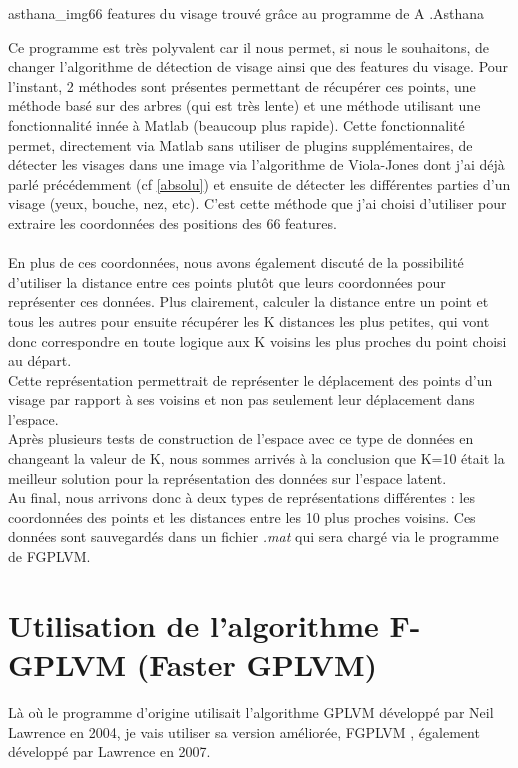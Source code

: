 \documentclass[poster]{polytech/polytech}
\begin{document}
\begin{Figure}{asthana_img}{66 features du visage trouvé grâce au programme de A .Asthana}
\end{Figure}

Ce programme est très polyvalent car il nous permet, si nous le souhaitons, de changer l'algorithme de détection de visage ainsi que des features du visage. Pour l'instant, 2 méthodes sont présentes permettant de récupérer ces points, une méthode basé sur des arbres (qui est très lente) et une méthode utilisant une fonctionnalité innée à Matlab (beaucoup plus rapide). Cette fonctionnalité permet, directement via Matlab sans utiliser de plugins supplémentaires, de détecter les visages dans une image via l'algorithme de Viola-Jones dont j'ai déjà parlé précédemment (cf \autoref{absolu}) et ensuite de détecter les différentes parties d'un visage (yeux, bouche, nez, etc). C'est cette méthode que j'ai choisi d'utiliser pour extraire les coordonnées des positions des 66 features.\\
\\
En plus de ces coordonnées, nous avons également discuté de la possibilité d'utiliser la distance entre ces points plutôt que leurs coordonnées pour représenter ces données. Plus clairement, calculer la distance entre un point et tous les autres pour ensuite récupérer les K distances les plus petites, qui vont donc correspondre en toute logique aux K voisins les plus proches du point choisi au départ.\\
Cette représentation permettrait de représenter le déplacement des points d'un visage par rapport à ses voisins et non pas seulement leur déplacement dans l'espace.\\
Après plusieurs tests de construction de l'espace avec ce type de données en changeant la valeur de K, nous sommes arrivés à la conclusion que K=10 était la meilleur solution pour la représentation des données sur l'espace latent.
\\
Au final, nous arrivons donc à deux types de représentations différentes : les coordonnées des points et les distances entre les 10 plus proches voisins. Ces données sont sauvegardés dans un fichier \textit{.mat} qui sera chargé via le programme de FGPLVM.

\section{Utilisation de l'algorithme F-GPLVM (Faster GPLVM)}
Là où le programme d'origine utilisait l'algorithme GPLVM développé par Neil Lawrence \cite{lawrence2004} \cite{gplvm_github} en 2004, je vais utiliser sa version améliorée, FGPLVM \cite{fgplvm_github}, également développé par Lawrence en 2007.\\
\end{document}
